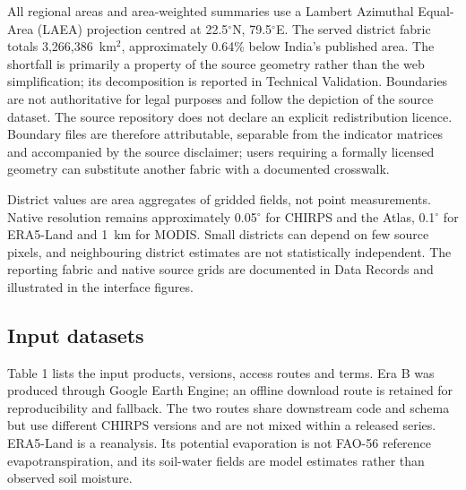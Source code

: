 \documentclass[11pt,a4paper]{article}
\begin{document}
All regional areas and area-weighted summaries use a Lambert Azimuthal Equal-Area (LAEA) projection centred at 22.5$^\circ$N, 79.5$^\circ$E. The served district fabric totals 3,266,386~km$^2$, approximately 0.64\% below India's published area. The shortfall is primarily a property of the source geometry rather than the web simplification; its decomposition is reported in Technical Validation. Boundaries are not authoritative for legal purposes and follow the depiction of the source dataset. The source repository does not declare an explicit redistribution licence. Boundary files are therefore attributable, separable from the indicator matrices and accompanied by the source disclaimer; users requiring a formally licensed geometry can substitute another fabric with a documented crosswalk.

District values are area aggregates of gridded fields, not point measurements. Native resolution remains approximately 0.05$^\circ$ for CHIRPS and the Atlas, 0.1$^\circ$ for ERA5-Land and 1~km for MODIS. Small districts can depend on few source pixels, and neighbouring district estimates are not statistically independent. The reporting fabric and native source grids are documented in Data Records and illustrated in the interface figures.

\subsection*{Input datasets}
Table 1 lists the input products, versions, access routes and terms. Era B was produced through Google Earth Engine\citep{Gorelick2017}; an offline download route is retained for reproducibility and fallback. The two routes share downstream code and schema but use different CHIRPS versions and are not mixed within a released series. ERA5-Land is a reanalysis\citep{Hersbach2020}. Its potential evaporation is not FAO-56 reference evapotranspiration, and its soil-water fields are model estimates rather than observed soil moisture.
\end{document}
